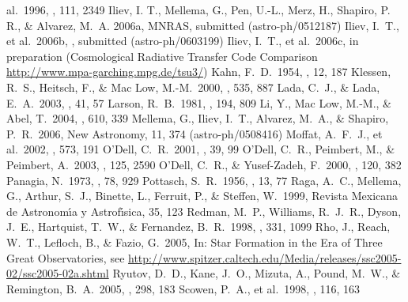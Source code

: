 \documentclass[debug]{rmaa}
\begin{document}
\begin{thebibliography}
al.\ 1996, \aj, 111, 2349 
 Iliev, I. T., Mellema, G.,
  Pen, U.-L., Merz, H., Shapiro, P. R., \& Alvarez, M.~A.  2006a,
  MNRAS, submitted (astro-ph/0512187)
 Iliev, I.~T., et
  al.\ 2006b, \mnras, submitted (astro-ph/0603199)
 Iliev, I.~T., et
  al.\ 2006c, in preparation (Cosmological Radiative Transfer Code Comparison  
  \url{http://www.mpa-garching.mpg.de/tsu3/})
 Kahn, F.~D.\ 1954, \bain, 12, 187 
 Klessen, R.~S.,
  Heitsch, F., \& Mac Low, M.-M.\ 2000, \apj, 535, 887
 Lada, C.~J., \&
Lada, E.~A.\ 2003, \araa, 41, 57 
 Larson, R.~B.\ 1981,
\mnras, 194, 809 
 Li, Y., Mac Low, M.-M.,
\& Abel, T.\ 2004, \apj, 610, 339 
 Mellema, G.,
  Iliev, I.~T., Alvarez, M.~A., \& Shapiro, P.~R.\ 2006, New
  Astronomy, 11, 374 (astro-ph/0508416)
 Moffat, A.~F.~J., et 
al.\ 2002, \apj, 573, 191 
 O'Dell, C.~R.\ 2001, \araa, 39, 
99 
 O'Dell, C.~R., Peimbert, 
M., \& Peimbert, A.\ 2003, \aj, 125, 2590 
  O'Dell, C.~R., 
\& Yusef-Zadeh, F.\ 2000, \aj, 120, 382 
 Panagia, N.\ 1973, \aj,
78, 929 
 Pottasch, S.~R.\ 1956, \bain, 
13, 77 
 Raga, A.~C., Mellema, G., 
Arthur, S.~J., Binette, L., Ferruit, P., \& Steffen, W.\ 1999, Revista 
Mexicana de Astronom\'\i{}a y Astrof\'\i{}sica, 35, 123
 Redman, M.~P., Williams, 
R.~J.~R., Dyson, J.~E., Hartquist, T.~W., \& Fernandez, B.~R.\ 1998, \aap, 
331, 1099 
 Rho, J., Reach, W.~T., 
Lefloch, B., \& Fazio, G.\ 2005, In: Star Formation in the Era of Three Great 
Observatories, see
\url{http://www.spitzer.caltech.edu/Media/releases/ssc2005-02/ssc2005-02a.shtml}
 Ryutov, D.~D., Kane, 
J.~O., Mizuta, A., Pound, M.~W., \& Remington, B.~A.\ 2005, \apss, 298, 183 
 Scowen, P.~A., et al.\ 
1998, \aj, 116, 163 

\end{thebibliography}
\end{document}
